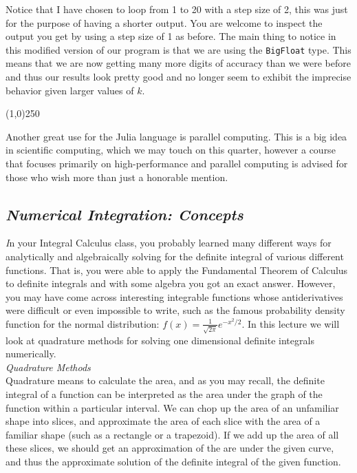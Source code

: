 \documentclass[11pt,a4paper,oneside]{report}
\begin{document}
Notice that I have chosen to loop from 1 to 20 with a step size of 2, this was just for the purpose of having a shorter output. You are welcome to inspect the output you get by using a step size of 1 as before. The main thing to notice in this modified version of our program is that we are using the \verb+BigFloat+ type. This means that we are now getting many more digits of accuracy than we were before and thus our results look pretty good and no longer seem to exhibit the imprecise behavior given larger values of $k$.

\begin{center}
\line(1,0){250}
\end{center}

Another great use for the Julia language is parallel computing. This is a big idea in scientific computing, which we may touch on this quarter, however a course that focuses primarily on high-performance and parallel computing is advised for those who wish more than just a honorable mention. 
\newpage

{\center\color{magenta}
\subsection*{\it\huge Numerical Integration: Concepts}}

{\it\huge I}n your Integral Calculus class, you probably learned many different ways for analytically and algebraically solving for the definite integral of various different functions. That is, you were able to apply the Fundamental Theorem of Calculus to definite integrals and with some algebra you got an exact answer. However, you may have come across interesting integrable functions whose antiderivatives were difficult or even impossible to write, such as the famous probability density function for the normal distribution: $f(x)= \displaystyle \frac{1}{\sqrt{2 \pi}}e^{-x^2/2}$. In this lecture we will look at quadrature methods for solving one dimensional definite integrals numerically.\\

{\it\Large\color{red} Quadrature Methods}\\

Quadrature means to calculate the area, and as you may recall, the definite integral of a function can be interpreted as the area under the graph of the function within a particular interval. We can chop up the area of an unfamiliar shape into slices, and approximate the area of each slice with the area of a familiar shape (such as a rectangle or a trapezoid). If we add up the area of all these slices, we should get an approximation of the are under the given curve, and thus the approximate solution of the definite integral of the given function.\\
\end{document}

